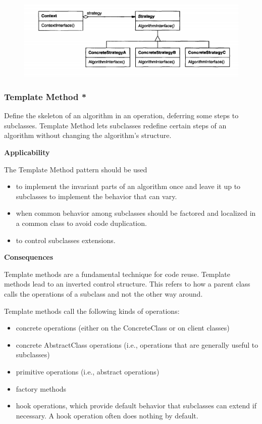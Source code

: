 \documentclass{article}
\begin{document}
\begin{figure}[h]
    \centering
    \includegraphics[width=14cm]{diagrams/pattern-21-strategy.png}
\end{figure}

\newpage
\subsubsection{Template Method *}
Define the skeleton of an algorithm in an operation, deferring some steps to subclasses. Template Method lets subclasses redefine certain steps of an algorithm without changing the algorithm's structure.

\textbf{Applicability}

The Template Method pattern should be used

\begin{itemize}
    \item to implement the invariant parts of an algorithm once and leave it up to subclasses to implement the behavior that can vary.
    \item when common behavior among subclasses should be factored and localized in a common class to avoid code duplication.
    \item to control subclasses extensions.
\end{itemize}

\textbf{Consequences}

Template methods are a fundamental technique for code reuse. Template methods lead to an inverted control structure. This refers to how a parent class calls the operations of a subclass and not the other way around.

Template methods call the following kinds of operations:
\begin{itemize}
    \item concrete operations (either on the ConcreteClass or on client classes)
    \item concrete AbstractClass operations (i.e., operations that are generally useful to subclasses)
    \item primitive operations (i.e., abstract operations)
    \item factory methods
    \item hook operations, which provide default behavior that subclasses can extend if necessary. A hook operation often does nothing by default.
\end{itemize}
\end{document}
